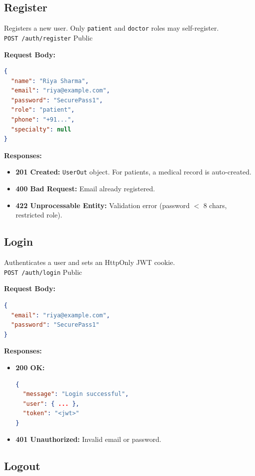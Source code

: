 \documentclass[a4paper,12pt]{report}
\begin{document}
\subsection{Register}

Registers a new user. Only \texttt{patient} and \texttt{doctor} roles may self-register. \\
\texttt{POST /auth/register} \hfill Public

\noindent\textbf{Request Body:}
\begin{lstlisting}[language=json]
{
  "name": "Riya Sharma",
  "email": "riya@example.com",
  "password": "SecurePass1",
  "role": "patient",
  "phone": "+91...",
  "specialty": null
}
\end{lstlisting}

\noindent\textbf{Responses:}
\begin{itemize}
    \item \textbf{201 Created:} \texttt{UserOut} object. For patients, a medical record is auto-created.
    \item \textbf{400 Bad Request:} Email already registered.
    \item \textbf{422 Unprocessable Entity:} Validation error (password $<$ 8 chars, restricted role).
\end{itemize}

\subsection{Login}

Authenticates a user and sets an HttpOnly JWT cookie. \\
\texttt{POST /auth/login} \hfill Public

\noindent\textbf{Request Body:}
\begin{lstlisting}[language=json]
{
  "email": "riya@example.com",
  "password": "SecurePass1"
}
\end{lstlisting}

\noindent\textbf{Responses:}
\begin{itemize}
    \item \textbf{200 OK:}
\begin{lstlisting}[language=json]
{
  "message": "Login successful",
  "user": { ... },
  "token": "<jwt>"
}
\end{lstlisting}
    \item \textbf{401 Unauthorized:} Invalid email or password.
\end{itemize}

\subsection{Logout}
\end{document}
